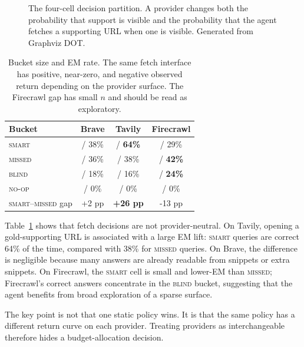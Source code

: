 \documentclass[11pt]{article}
\newcommand{\smart}{\textsc{smart}}
\newcommand{\missed}{\textsc{missed}}
\newcommand{\blind}{\textsc{blind}}
\newcommand{\noop}{\textsc{no-op}}
\begin{document}
\begin{figure}[t]
\centering
\resizebox{\columnwidth}{!}{}
\caption{The four-cell decision partition. A provider changes both the probability that support is visible and the probability that the agent fetches a supporting URL when one is visible. Generated from Graphviz DOT.}
\label{fig:partition}
\end{figure}

\begin{table}[t]
\centering
\small
\begin{tabular}{lccc}
\toprule
\textbf{Bucket} & \textbf{Brave} & \textbf{Tavily} & \textbf{Firecrawl} \\
\midrule
\smart{} & \BraveSmartN{} / 38\% & \TavilySmartN{} / \textbf{64\%} & \FirecrawlSmartN{} / 29\% \\
\missed{} & \BraveMissedN{} / 36\% & \TavilyMissedN{} / 38\% & \FirecrawlMissedN{} / \textbf{42\%} \\
\blind{} & \BraveBlindN{} / 18\% & \TavilyBlindN{} / 16\% & \FirecrawlBlindN{} / \textbf{24\%} \\
\noop{} & \BraveNoopN{} / 0\% & \TavilyNoopN{} / 0\% & \FirecrawlNoopN{} / 0\% \\
\midrule
\smart{}--\missed{} gap & +2 pp & \textbf{+26 pp} & -13 pp \\
\bottomrule
\end{tabular}
\caption{Bucket size and EM rate. The same fetch interface has positive, near-zero, and negative observed return depending on the provider surface. The Firecrawl gap has small $n$ and should be read as exploratory.}
\label{tab:buckets}
\end{table}

Table~\ref{tab:buckets} shows that fetch decisions are not provider-neutral. On Tavily, opening a gold-supporting URL is associated with a large EM lift: \smart{} queries are correct 64\% of the time, compared with 38\% for \missed{} queries. On Brave, the difference is negligible because many answers are already readable from snippets or extra snippets. On Firecrawl, the \smart{} cell is small and lower-EM than \missed{}; Firecrawl's correct answers concentrate in the \blind{} bucket, suggesting that the agent benefits from broad exploration of a sparse surface.

The key point is not that one static policy wins. It is that the same policy has a different return curve on each provider. Treating providers as interchangeable therefore hides a budget-allocation decision.
\end{document}
